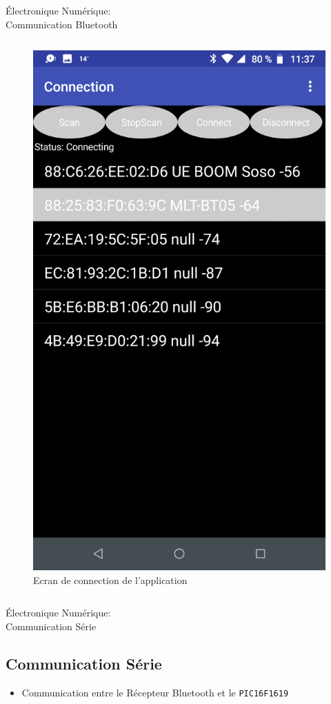 \documentclass{beamer}
\begin{document}
\begin{frame}{Électronique Numérique:\\Communication Bluetooth}
\begin{columns}[T]
\begin{column}{0.5\textwidth}
\begin{figure}
	    			\hspace*{2em}\includegraphics[height=0.8\textheight]{../Illus/AppConnection.png}
	    			\caption{Ecran de connection de l'application}
	    		\end{figure}
	  		\end{column}
		\end{columns}
		
	\end{frame}
	\begin{frame}{Électronique Numérique:\\Communication Série}
		\subsection[Série]{Communication Série}
		\begin{itemize}
		    \item Communication entre le Récepteur Bluetooth et le \texttt{PIC16F1619}
		\end{itemize}
	\end{frame}
\end{document}
